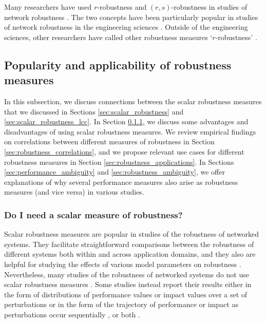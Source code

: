 \documentclass{comnet-mod}
\begin{document}
Many researchers have used $r$-robustness and $(r,s)$-robustness in studies of network robustness \cite{Shahrivar2015, Zhang2015, MoradiShahrivar2017, Usevitch2017, Abbas2018, Usevitch2020, Ishii2022}. The two concepts have been particularly popular in studies of network robustness in the engineering sciences \cite{Abbas2018, Ishii2022}. Outside of the engineering sciences, other researchers have called other robustness measures `$r$-robustness' \cite{Gorban2007}.


\subsection{Popularity and applicability of robustness measures}\label{sec:choosing_robustness}

In this subsection, we discuss connections between the scalar robustness measures that we discussed in Sections \ref{sec:scalar_robustness} and \ref{sec:scalar_robustness_lcc}. In Section \ref{sec:robustness_dist}, we discuss some advantages and disadvantages of using scalar robustness measures. We review empirical findings on correlations between different measures of robustness in Section \ref{sec:robustness_correlations}, and we propose relevant use cases for different robustness measures in Section \ref{sec:robustness_applications}. In Sections \ref{sec:performance_ambiguity} and \ref{sec:robustness_ambiguity}, we offer explanations of why several performance measures also arise as robustness measures (and vice versa) in various studies.


\subsubsection{Do I need a scalar measure of robustness?}\label{sec:robustness_dist}

Scalar robustness measures are popular in studies of the robustness of networked systems. They facilitate straightforward comparisons between the robustness of different systems both within \cite{Dodds2003, Ahmadi2015, Li2023b} and across \cite{Schneider2011} application domains, and they also are helpful for studying the effects of various model parameters on robustness \cite{Scellato2011, Wu2011, Zhang2013}. Nevertheless, many studies of the robustness of networked systems do not use scalar robustness measures \cite{Albert2000, Trajanovski2013, Manzano2014, Henneaux2015, Henneaux2015a, Phan2018, Ferrari2023}. Some studies instead report their results either in the form of distributions of performance values or impact values over a set of perturbations \cite{Henneaux2015, Henneaux2015a, Panteli2015, Phan2018} or in the form of the trajectory of performance or impact as perturbations occur sequentially \cite{Albert2000, Iyer2013, Ventresca2014, Ren2016, Kazawa2020, Ferrari2023}, or both \cite{Trajanovski2013, Zanin2018, Sun2021}.
\end{document}
